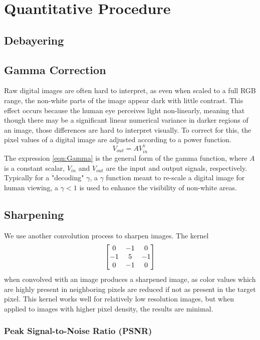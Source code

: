 \documentclass{article}\twocolumn
\begin{document}
\section{Quantitative Procedure}

\subsection{Debayering}

    
    
\subsection{Gamma Correction}
    Raw digital images are often hard to interpret, as even when scaled to a full RGB range, the non-white parts of the image appear dark with little contrast. This effect occurs because the human eye perceives light non-linearly, meaning that though there may be a significant linear numerical variance in darker regions of an image, those differences are hard to interpret visually. To correct for this, the pixel values of a digital image are adjusted according to a power function. 
    \begin{equation}
        V_{out} = AV_{in}^{\gamma} \label{eqn:Gamma}
    \end{equation}
    The expression \eqref{eqn:Gamma} is the general form of the gamma function, where $A$ is a constant scalar, $V_{in}$ and $V_{out}$ are the input and output signals, respectively. 
    Typically for a "decoding" $\gamma$, a $\gamma$ function meant to re-scale a digital image for human viewing, a $\gamma < 1$ is used to enhance the visibility of non-white areas. 
\subsection{Sharpening}
    We use another convolution process to sharpen images. The kernel 
    \begin{align}
        \begin{bmatrix} 0 & -1 & 0 \\ -1 & 5 & -1 \\ 0 & -1 & 0 \end{bmatrix}
    \end{align}
when convolved with an image produces a sharpened image, as color values which are highly present in neighboring pixels are reduced if not as present in the target pixel. This kernel works well for relatively low resolution images, but when applied to images with higher pixel density, the results are minimal. 

\subsubsection{Peak Signal-to-Noise Ratio (PSNR)}
\end{document}
